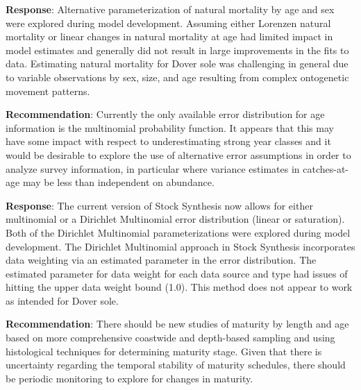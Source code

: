 \documentclass[11pt,
  english,
  a4paper,
]{article}
\begin{document}

\textbf{Response}: Alternative parameterization of natural mortality by age and sex were explored during model development. Assuming either Lorenzen natural mortality or linear changes in natural mortality at age had limited impact in model estimates and generally did not result in large improvements in the fits to data. Estimating natural mortality for Dover sole was challenging in general due to variable observations by sex, size, and age resulting from complex ontogenetic movement patterns.

\leavevmode\tagmcend\tagstructend\par


\textbf{Recommendation}: Currently the only available error distribution for age information is the multinomial probability function. It appears that this may have some impact with respect to underestimating strong year classes and it would be desirable to explore the use of alternative error assumptions in order to analyze survey information, in particular where variance estimates in catches-at-age may be less than independent on abundance.

\leavevmode\tagmcend\tagstructend\par


\textbf{Response}: The current version of Stock Synthesis now allows for either multinomial or a Dirichlet Multinomial error distribution (linear or saturation). Both of the Dirichlet Multinomial parameterizations were explored during model development. The Dirichlet Multinomial approach in Stock Synthesis incorporates data weighting via an estimated parameter in the error distribution. The estimated parameter for data weight for each data source and type had issues of hitting the upper data weight bound (1.0). This method does not appear to work as intended for Dover sole.

\leavevmode\tagmcend\tagstructend\par


\textbf{Recommendation}: There should be new studies of maturity by length and age based on more comprehensive coastwide and depth-based sampling and using histological techniques for determining maturity stage. Given that there is uncertainty regarding the temporal stability of maturity schedules, there should be periodic monitoring to explore for changes in maturity.
\end{document}
